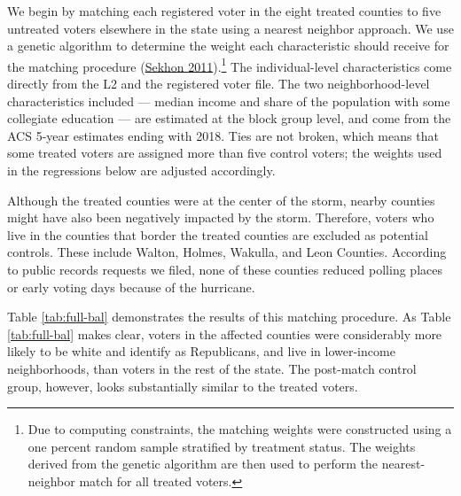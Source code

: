 \documentclass[
  12pt,
]{article}
\begin{document}
We begin by matching each registered voter in the eight treated counties to five untreated voters elsewhere in the state using a nearest neighbor approach. We use a genetic algorithm to determine the weight each characteristic should receive for the matching procedure (\protect\hyperlink{ref-Sekhon2011}{Sekhon 2011}).\footnote{Due to computing constraints, the matching weights were constructed using a one percent random sample stratified by treatment status. The weights derived from the genetic algorithm are then used to perform the nearest-neighbor match for all treated voters.} The individual-level characteristics come directly from the L2 and the registered voter file. The two neighborhood-level characteristics included --- median income and share of the population with some collegiate education --- are estimated at the block group level, and come from the ACS 5-year estimates ending with 2018. Ties are not broken, which means that some treated voters are assigned more than five control voters; the weights used in the regressions below are adjusted accordingly.

Although the treated counties were at the center of the storm, nearby counties might have also been negatively impacted by the storm. Therefore, voters who live in the counties that border the treated counties are excluded as potential controls. These include Walton, Holmes, Wakulla, and Leon Counties. According to public records requests we filed, none of these counties reduced polling places or early voting days because of the hurricane.

Table \ref{tab:full-bal} demonstrates the results of this matching procedure. As Table \ref{tab:full-bal} makes clear, voters in the affected counties were considerably more likely to be white and identify as Republicans, and live in lower-income neighborhoods, than voters in the rest of the state. The post-match control group, however, looks substantially similar to the treated voters.
\end{document}
